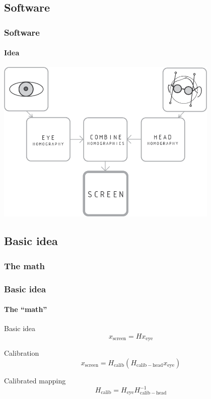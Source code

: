 \documentclass[%
14pt
]{beamer}
\begin{document}
\subsection{Software}
\begin{frame}
	\frametitle{Software}
  \framesubtitle{Idea}
  \vspace*{-0.5cm}
  \begin{center}
    \includegraphics[width=0.8\textwidth]{01.png}
  \end{center}

\end{frame}

\subsection{Basic idea}
\subsubsection{The math}
\begin{frame}
	\frametitle{Basic idea}
  \framesubtitle{The ``math''}
  \begin{block}{Basic idea}
    \begin{equation*}
      x_\mathrm{screen} = H x_\mathrm{eye}
    \end{equation*}
  \end{block}\pause
  \begin{block}{Calibration}
    \begin{equation*}
      x_\mathrm{screen} = H_\mathrm{calib} (H_\mathrm{calib-head} x_\mathrm{eye})
    \end{equation*}
  \end{block}\pause
  \begin{block}{Calibrated mapping}
    \begin{equation*}
      H_\mathrm{calib} = H_\mathrm{eye} H_\mathrm{calib-head} ^{-1}
    \end{equation*}
  \end{block}
\end{frame}
\end{document}
